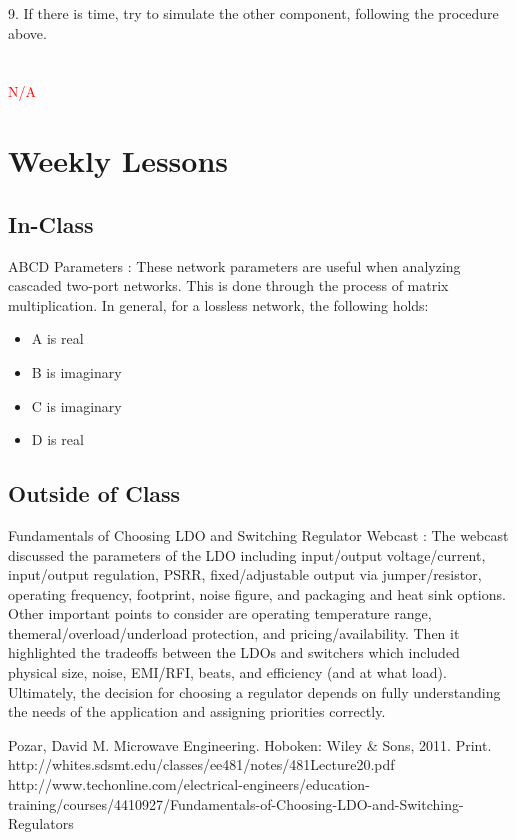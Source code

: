 \documentclass[conference]{IEEEtran}
\begin{document}
9. If there is time, try to simulate the other component, following the procedure above.\\\\\\
\textcolor{red}{N/A}

\section{Weekly Lessons}
\subsection{In-Class}
ABCD Parameters \cite{abcd}: These network parameters are useful when analyzing cascaded two-port networks.  This is done through the process of matrix multiplication.  In general, for a lossless network, the following holds:
\begin{itemize}
\item A is real
\item B is imaginary
\item C is imaginary
\item D is real
\end{itemize}

\subsection{Outside of Class}
Fundamentals of Choosing LDO and Switching Regulator Webcast \cite{edn}:  The webcast discussed the parameters of the LDO including input/output voltage/current, input/output regulation, PSRR, fixed/adjustable output via jumper/resistor, operating frequency, footprint, noise figure, and packaging and heat sink options.  Other important points to consider are operating temperature range, themeral/overload/underload protection, and pricing/availability.  Then it highlighted the tradeoffs between the LDOs and switchers which included physical size, noise, EMI/RFI, beats, and efficiency (and at what load).  Ultimately, the decision for choosing a regulator depends on fully understanding the needs of the application and assigning priorities correctly.

\begin{thebibliography}{1}
Pozar, David M. Microwave Engineering. Hoboken: Wiley \& Sons, 2011. Print.
http://whites.sdsmt.edu/classes/ee481/notes/481Lecture20.pdf
http://www.techonline.com/electrical-engineers/education-training/courses/4410927/Fundamentals-of-Choosing-LDO-and-Switching-Regulators
\end{thebibliography}
\end{document}
